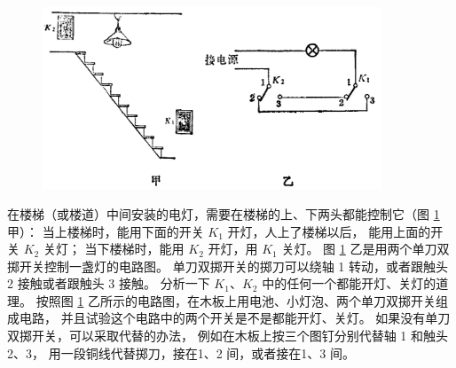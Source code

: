 \begin{figure}[htbp]
    \centering
    \includegraphics[width=0.9\textwidth]{../pic/czwl2-ch11-13}
    \caption{}\label{fig:11-13}
\end{figure}

在楼梯（或楼道）中间安装的电灯，需要在楼梯的上、下两头都能控制它（图 \ref{fig:11-13} 甲）：
当上楼梯时，能用下面的开关 $K_1$ 开灯，人上了楼梯以后， 能用上面的开关 $K_2$ 关灯；
当下楼梯时，能用 $K_2$ 开灯，用 $K_1$ 关灯。
图 \ref{fig:11-13} 乙是用两个单刀双掷开关控制一盏灯的电路图。
单刀双掷开关的掷刀可以绕轴 1 转动，或者跟触头 2 接触或者跟触头 3 接触。
分析一下 $K_1$、$K_2$ 中的任何一个都能开灯、关灯的道理。
按照图 \ref{fig:11-13} 乙所示的电路图，在木板上用电池、小灯泡、两个单刀双掷开关组成电路，
并且试验这个电路中的两个开关是不是都能开灯、关灯。
如果没有单刀双掷开关，可以采取代替的办法，
例如在木板上按三个图钉分别代替轴 1 和触头2、3，
用一段铜线代替掷刀，接在1、2 间，或者接在1、3 间。

